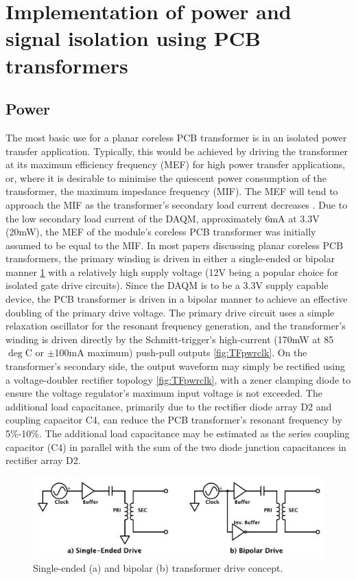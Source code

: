 \documentclass[conference]{IEEEtran}
\begin{document}
\section{Implementation of power and signal isolation using PCB transformers}

	\subsection{Power}
	The most basic use for a planar coreless PCB transformer is in an isolated power transfer application.  Typically, this would be achieved by driving the transformer at its maximum efficiency frequency (MEF) for high power transfer applications, or, where it is desirable to minimise the quiescent power consumption of the transformer, the maximum impedance frequency (MIF).  The MEF will tend to approach the MIF as the transformer's secondary load current decreases \cite{TangHuiFundamental}.  
	Due to the low secondary load current of the DAQM, approximately 6mA at 3.3V (20mW), the MEF of the module's coreless PCB transformer was initially assumed to be equal to the MIF.  In most papers discussing planar coreless PCB transformers, the primary winding is driven in either a single-ended or bipolar manner \ref{fig:BIvsSE} with a relatively high supply voltage (12V being a popular choice for isolated gate drive circuits).  Since the DAQM is to be a 3.3V supply capable device, the PCB transformer is driven in a bipolar manner to achieve an effective doubling of the primary drive voltage.  The primary drive circuit uses a simple relaxation oscillator for the resonant frequency generation, and the transformer's winding is driven directly by the Schmitt-trigger's high-current (170mW at 85$\deg$C or $\pm$100mA maximum) push-pull outputs \ref{fig:TFpwrclk}.
	On the transformer's secondary side, the output waveform may simply be rectified using a voltage-doubler rectifier topology \ref{fig:TFpwrclk}, with a zener clamping diode to ensure the voltage regulator's maximum input voltage is not exceeded.  The additional load capacitance, primarily due to the rectifier diode array D2 and coupling capacitor C4, can reduce the PCB transformer's resonant frequency by 5\%-10\%.  The additional load capacitance may be estimated as the series coupling capacitor (C4) in parallel with the sum of the two diode junction capacitances in rectifier array D2.
	
	\begin{figure}[t]
		\centering
		\includegraphics[width=0.6\columnwidth]{./img/BIvsSE}
		\caption{Single-ended (a) and bipolar (b) transformer drive concept.}
		\label{fig:BIvsSE}
	\end{figure}
	
\end{document}
